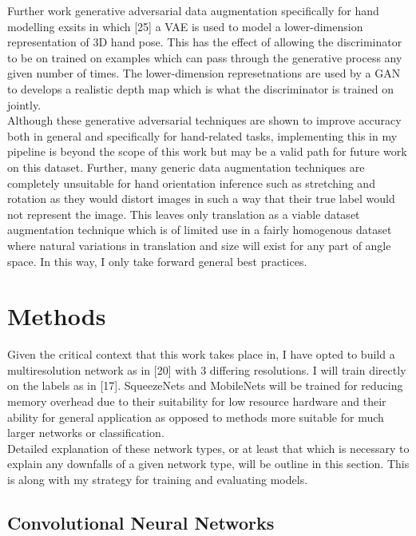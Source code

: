 \documentclass{article}
\begin{document}
Further work generative adversarial data augmentation specifically for hand modelling exsits in which [25] a VAE is used to model a lower-dimension representation of 3D hand pose. This has the effect of allowing the discriminator to be on trained on examples which can pass through the generative process any given number of times. The lower-dimension represetnations are used by a GAN to develops a realistic depth map which is what the discriminator is trained on jointly. \\

Although these generative adversarial techniques are shown to improve accuracy both in general and specifically for hand-related tasks, implementing this in my pipeline is beyond the scope of this work but may be a valid path for future work on this dataset. Further, many generic data augmentation techniques are completely unsuitable for hand orientation inference such as stretching and rotation as they would distort images in such a way that their true label would not represent the image. This leaves only translation as a viable dataset augmentation technique which is of limited use in a fairly homogenous dataset where natural variations in translation and size will exist for any part of angle space. In this way, I only take forward general best practices.

\section{Methods}

Given the critical context that this work takes place in, I have opted to build a multiresolution network as in [20] with 3 differing resolutions. I will train directly on the labels as in [17]. SqueezeNets and MobileNets will be trained for reducing memory overhead due to their suitability for low resource hardware and their ability for general application as opposed to methods more suitable for much larger networks or classification. \\

Detailed explanation of these network types, or at least that which is necessary to explain any downfalls of a given network type, will be outline in this section. This is along with my strategy for training and evaluating models. \\ 

\subsection{Convolutional Neural Networks}
\end{document}
